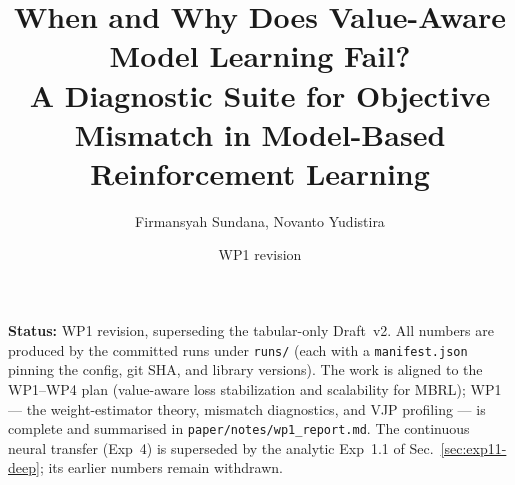 \documentclass[11pt]{article}
\title{When and Why Does Value-Aware Model Learning Fail?\\
  \large A Diagnostic Suite for Objective Mismatch in Model-Based Reinforcement Learning}
\author{Firmansyah Sundana, Novanto Yudistira}
\date{WP1 revision}
\begin{document}
\maketitle

\begin{center}
\textbf{Status:} WP1 revision, superseding the tabular-only Draft~v2. All numbers are
produced by the committed runs under \texttt{runs/} (each with a \texttt{manifest.json}
pinning the config, git SHA, and library versions). The work is aligned to the WP1--WP4
plan (value-aware loss stabilization and scalability for MBRL); WP1 --- the
weight-estimator theory, mismatch diagnostics, and VJP profiling --- is complete and
summarised in \texttt{paper/notes/wp1\_report.md}. The continuous neural transfer
(Exp~4) is superseded by the analytic Exp~1.1 of Sec.~\ref{sec:exp11-deep}; its earlier
numbers remain withdrawn.
\end{center}
\end{document}
